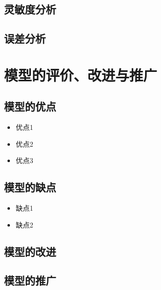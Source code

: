 \documentclass[withoutpreface,bwprint]{cumcmthesis}
\begin{document}
\subsection{灵敏度分析}

\subsection{误差分析}















\newpage
\section{模型的评价、改进与推广}

\subsection{模型的优点}
\begin{itemize}[itemindent=2em]
\item 优点1
\item 优点2
\item 优点3
\end{itemize}

\subsection{模型的缺点}
\begin{itemize}[itemindent=2em]
\item 缺点1
\item 缺点2
\end{itemize}




\subsection{模型的改进}






\subsection{模型的推广}
\end{document}

